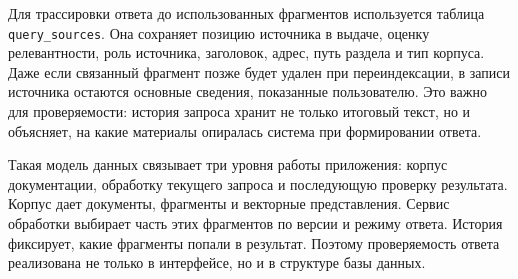 Для трассировки ответа до использованных фрагментов используется таблица \texttt{query\_sources}. Она сохраняет позицию источника в выдаче, оценку релевантности, роль источника, заголовок, адрес, путь раздела и тип корпуса. Даже если связанный фрагмент позже будет удален при переиндексации, в записи источника остаются основные сведения, показанные пользователю. Это важно для проверяемости: история запроса хранит не только итоговый текст, но и объясняет, на какие материалы опиралась система при формировании ответа.

Такая модель данных связывает три уровня работы приложения: корпус документации, обработку текущего запроса и последующую проверку результата. Корпус дает документы, фрагменты и векторные представления. Сервис обработки выбирает часть этих фрагментов по версии и режиму ответа. История фиксирует, какие фрагменты попали в результат. Поэтому проверяемость ответа реализована не только в интерфейсе, но и в структуре базы данных.

